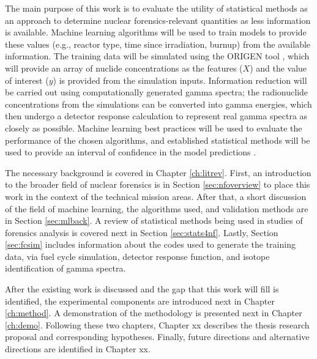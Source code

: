 The main purpose of this work is to evaluate the utility of statistical methods
as an approach to determine nuclear forensics-relevant quantities as less
information is available. Machine learning algorithms will be used to train
models to provide these values (e.g., reactor type, time since irradiation,
burnup) from the available information. The training data will be simulated
using the ORIGEN tool , which will provide an array of nuclide
concentrations as the features ($X$) and the value of interest ($y$) is
provided from the simulation inputs.  Information reduction will be carried out
using computationally generated gamma spectra; the radionuclide concentrations
from the simulations can be converted into gamma energies, which then undergo a
detector response calculation to represent real gamma spectra as closely as
possible. Machine learning best practices will be used to evaluate the
performance of the chosen algorithms, and established statistical methods will
be used to provide an interval of confidence in the model predictions
.

The necessary background is covered in Chapter \ref{ch:litrev}.  First, an
introduction to the broader field of nuclear forensics is in Section
\ref{sec:nfoverview} to place this work in the context of the technical mission
areas. After that, a short discussion of the field of machine learning, the
algorithms used, and validation methods are in Section \ref{sec:mlback}. A
review of statistical methods being used in studies of forensics analysis is
covered next in Section \ref{sec:stats4nf}. Lastly, Section \ref{sec:fcsim}
includes information about the codes used to generate the training data, via
fuel cycle simulation, detector response function, and isotope identification
of gamma spectra. 

After the existing work is discussed and the gap that this work will fill is
identified, the experimental components are introduced next in Chapter
\ref{ch:method}. A demonstration of the methodology is presented next in Chapter
\ref{ch:demo}. Following these two chapters, Chapter xx %
describes the thesis research proposal and corresponding hypotheses. 
Finally, future directions and alternative directions are identified in 
Chapter xx. %
